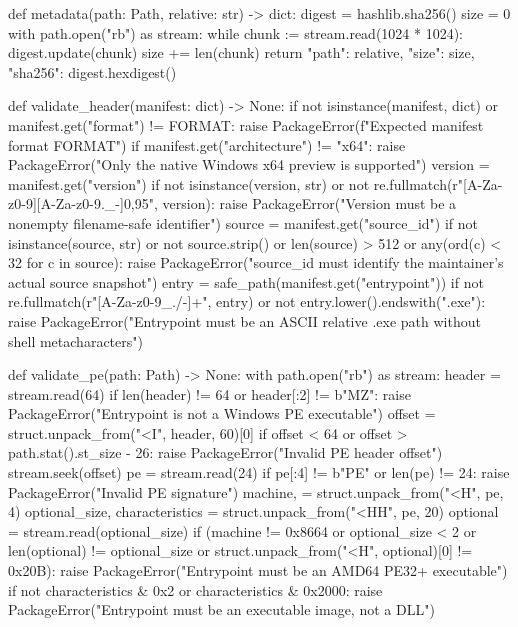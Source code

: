 def metadata(path: Path, relative: str) -> dict:
    digest = hashlib.sha256()
    size = 0
    with path.open("rb") as stream:
        while chunk := stream.read(1024 * 1024):
            digest.update(chunk)
            size += len(chunk)
    return {"path": relative, "size": size, "sha256": digest.hexdigest()}


def validate_header(manifest: dict) -> None:
    if not isinstance(manifest, dict) or manifest.get("format") != FORMAT:
        raise PackageError(f"Expected manifest format {FORMAT}")
    if manifest.get("architecture") != "x64":
        raise PackageError("Only the native Windows x64 preview is supported")
    version = manifest.get("version")
    if not isinstance(version, str) or not re.fullmatch(r"[A-Za-z0-9][A-Za-z0-9._-]{0,95}", version):
        raise PackageError("Version must be a nonempty filename-safe identifier")
    source = manifest.get("source_id")
    if not isinstance(source, str) or not source.strip() or len(source) > 512 or any(ord(c) < 32 for c in source):
        raise PackageError("source_id must identify the maintainer's actual source snapshot")
    entry = safe_path(manifest.get("entrypoint"))
    if not re.fullmatch(r"[A-Za-z0-9_./-]+", entry) or not entry.lower().endswith(".exe"):
        raise PackageError("Entrypoint must be an ASCII relative .exe path without shell metacharacters")


def validate_pe(path: Path) -> None:
    with path.open("rb") as stream:
        header = stream.read(64)
        if len(header) != 64 or header[:2] != b"MZ":
            raise PackageError("Entrypoint is not a Windows PE executable")
        offset = struct.unpack_from("<I", header, 60)[0]
        if offset < 64 or offset > path.stat().st_size - 26:
            raise PackageError("Invalid PE header offset")
        stream.seek(offset)
        pe = stream.read(24)
        if pe[:4] != b"PE\0\0" or len(pe) != 24:
            raise PackageError("Invalid PE signature")
        machine, = struct.unpack_from("<H", pe, 4)
        optional_size, characteristics = struct.unpack_from("<HH", pe, 20)
        optional = stream.read(optional_size)
        if (machine != 0x8664 or optional_size < 2 or len(optional) != optional_size
                or struct.unpack_from("<H", optional)[0] != 0x20B):
            raise PackageError("Entrypoint must be an AMD64 PE32+ executable")
        if not characteristics & 0x2 or characteristics & 0x2000:
            raise PackageError("Entrypoint must be an executable image, not a DLL")


